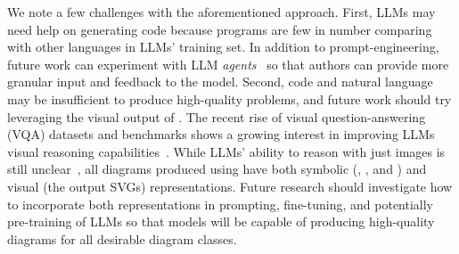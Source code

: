 We note a few challenges with the aforementioned approach. First, LLMs may need help on generating \Substance code because \Substance programs are few in number comparing with other languages in LLMs' training set. In addition to prompt-engineering, future work can experiment with LLM \textit{agents}~\cite{wu_agentkit_2024} so that authors can provide more granular input and feedback to the model. Second, code and natural language may be insufficient to produce high-quality problems, and future work should try leveraging the visual output of \Edgeworth. The recent rise of visual question-answering (VQA) datasets and benchmarks shows a growing interest in improving LLMs visual reasoning capabilities~\cite{lu_mathvista_2024,belouadi_automatikz_2024,fatemi_talk_2023,masry_chartqa_2022}.  While LLMs' ability to reason with just images is still unclear~\cite{rahmanzadehgervi_vision_2024}, all diagrams produced using \Edgeworth have both symbolic (\ie \Substance, \Style, and \Domain) and visual (\ie the output SVGs) representations. Future research should investigate how to incorporate both representations in prompting, fine-tuning, and potentially pre-training of LLMs so that models will be capable of producing high-quality diagrams for all desirable diagram classes.


